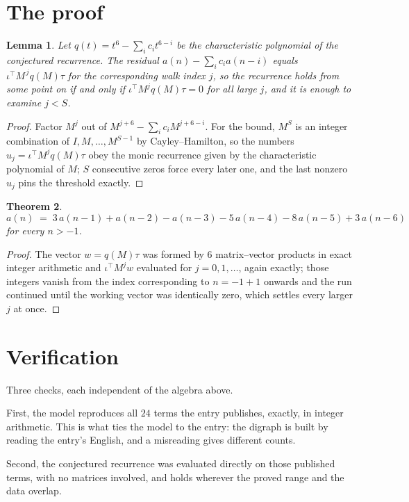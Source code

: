 \documentclass[11pt,a4paper]{article}
\theoremstyle{plain}
\newtheorem{theorem}{Theorem}
\newtheorem{lemma}[theorem]{Lemma}
\theoremstyle{definition}
\begin{document}
\section{The proof}

\begin{lemma}\label{lem:crit}
Let $q(t)=t^{6}-\sum_i c_it^{6-i}$ be the characteristic polynomial of the
conjectured recurrence. The residual $a(n)-\sum_ic_ia(n-i)$ equals
$\iota^{\!\top}M^{\,j}q(M)\tau$ for the corresponding walk index $j$, so the recurrence
holds from some point on if and only if $\iota^{\!\top}M^{j}q(M)\tau=0$ for all large $j$,
and it is enough to examine $j<S$.
\end{lemma}

\begin{proof}
Factor $M^{j}$ out of $M^{j+6}-\sum_ic_iM^{j+6-i}$. For the bound, $M^{S}$
is an integer combination of $I,M,\dots,M^{S-1}$ by Cayley--Hamilton, so the numbers
$u_j=\iota^{\!\top}M^{j}q(M)\tau$ obey the monic recurrence given by the characteristic
polynomial of $M$; $S$ consecutive zeros force every later one, and the last nonzero $u_j$
pins the threshold exactly.
\end{proof}

\begin{theorem}
\[
a(n)\;=\;3\,a(n-1) + a(n-2) - a(n-3) - 5\,a(n-4) - 8\,a(n-5) + 3\,a(n-6)
\]
for every $n>-1$.
\end{theorem}

\begin{proof}
The vector $w=q(M)\tau$ was formed by $6$ matrix--vector products in exact integer
arithmetic and $\iota^{\!\top}M^{j}w$ evaluated for $j=0,1,\dots$, again exactly; those
integers vanish from the index corresponding to $n=-1+1$ onwards and the run continued
until the working vector was identically zero, which settles every larger $j$ at once.
\end{proof}

\section{Verification}

Three checks, each independent of the algebra above.

First, the model reproduces all $24$ terms the entry publishes, exactly, in integer
arithmetic. This is what ties the model to the entry: the digraph is built by reading the
entry's English, and a misreading gives different counts.

Second, the conjectured recurrence was evaluated directly on those published terms, with no
matrices involved, and holds wherever the proved range and the data overlap.
\end{document}
